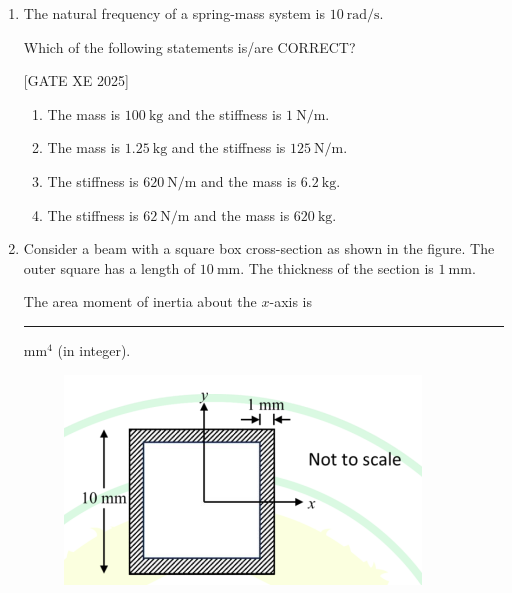 \documentclass[journal,12pt,onecolumn]{IEEEtran}
\theoremstyle{remark}
\begin{document}
\begin{enumerate}
\hfill[GATE XE 2025]


\begin{multicols}{2}
\begin{enumerate}
\item 1
\item 16
\item 5
\item 4
\end{enumerate}
\end{multicols}

\item The natural frequency of a spring-mass system is $10~\text{rad/s}$.

Which of the following statements is/are CORRECT?


\hfill[GATE XE 2025]


\begin{multicols}{2}
\begin{enumerate}
\item The mass is $100~\text{kg}$ and the stiffness is $1~\text{N/m}$.
\item The mass is $1.25~\text{kg}$ and the stiffness is $125~\text{N/m}$.
\item The stiffness is $620~\text{N/m}$ and the mass is $6.2~\text{kg}$.
\item The stiffness is $62~\text{N/m}$ and the mass is $620~\text{kg}$.
\end{enumerate}
\end{multicols}

\item Consider a beam with a square box cross-section as shown in the figure. The outer square has a length of $10~\text{mm}$. The thickness of the section is $1~\text{mm}$.

The area moment of inertia about the $x$-axis is \rule{3cm}{0.15mm} $\text{mm}^4$ (in integer).
\begin{figure}[H]
    \centering
    \includegraphics[width=0.5\columnwidth]{figs/fig18.png}
    \caption{}
    \label{fig:placeholder}
\end{figure}


\end{enumerate}
\end{document}
